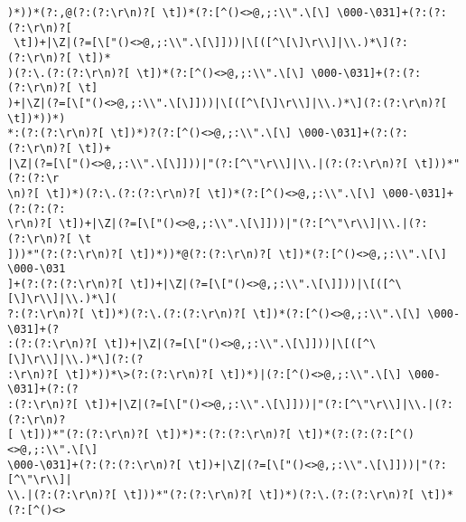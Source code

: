\documentclass[14pt]{beamer}
\begin{document}
\begin{frame}[fragile]
\begin{lstlisting}
)*))*(?:,@(?:(?:\r\n)?[ \t])*(?:[^()<>@,;:\\".\[\] \000-\031]+(?:(?:(?:\r\n)?[
 \t])+|\Z|(?=[\["()<>@,;:\\".\[\]]))|\[([^\[\]\r\\]|\\.)*\](?:(?:\r\n)?[ \t])*
)(?:\.(?:(?:\r\n)?[ \t])*(?:[^()<>@,;:\\".\[\] \000-\031]+(?:(?:(?:\r\n)?[ \t]
)+|\Z|(?=[\["()<>@,;:\\".\[\]]))|\[([^\[\]\r\\]|\\.)*\](?:(?:\r\n)?[ \t])*))*)
*:(?:(?:\r\n)?[ \t])*)?(?:[^()<>@,;:\\".\[\] \000-\031]+(?:(?:(?:\r\n)?[ \t])+
|\Z|(?=[\["()<>@,;:\\".\[\]]))|"(?:[^\"\r\\]|\\.|(?:(?:\r\n)?[ \t]))*"(?:(?:\r
\n)?[ \t])*)(?:\.(?:(?:\r\n)?[ \t])*(?:[^()<>@,;:\\".\[\] \000-\031]+(?:(?:(?:
\r\n)?[ \t])+|\Z|(?=[\["()<>@,;:\\".\[\]]))|"(?:[^\"\r\\]|\\.|(?:(?:\r\n)?[ \t
]))*"(?:(?:\r\n)?[ \t])*))*@(?:(?:\r\n)?[ \t])*(?:[^()<>@,;:\\".\[\] \000-\031
]+(?:(?:(?:\r\n)?[ \t])+|\Z|(?=[\["()<>@,;:\\".\[\]]))|\[([^\[\]\r\\]|\\.)*\](
?:(?:\r\n)?[ \t])*)(?:\.(?:(?:\r\n)?[ \t])*(?:[^()<>@,;:\\".\[\] \000-\031]+(?
:(?:(?:\r\n)?[ \t])+|\Z|(?=[\["()<>@,;:\\".\[\]]))|\[([^\[\]\r\\]|\\.)*\](?:(?
:\r\n)?[ \t])*))*\>(?:(?:\r\n)?[ \t])*)|(?:[^()<>@,;:\\".\[\] \000-\031]+(?:(?
:(?:\r\n)?[ \t])+|\Z|(?=[\["()<>@,;:\\".\[\]]))|"(?:[^\"\r\\]|\\.|(?:(?:\r\n)?
[ \t]))*"(?:(?:\r\n)?[ \t])*)*:(?:(?:\r\n)?[ \t])*(?:(?:(?:[^()<>@,;:\\".\[\] 
\000-\031]+(?:(?:(?:\r\n)?[ \t])+|\Z|(?=[\["()<>@,;:\\".\[\]]))|"(?:[^\"\r\\]|
\\.|(?:(?:\r\n)?[ \t]))*"(?:(?:\r\n)?[ \t])*)(?:\.(?:(?:\r\n)?[ \t])*(?:[^()<>

\end{lstlisting}
\end{frame}
\end{document}
